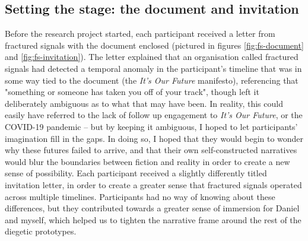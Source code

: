 \subsection{Setting the stage: the document and invitation}
\label{subsec:8-4-1-doc}
Before the research project started, each participant received a letter from fractured signals with the document enclosed  (pictured in figures \ref{fig:fs-document} and \ref{fig:fs-invitation}). The letter explained that an organisation called fractured signals had detected a temporal anomaly in the participant’s timeline that was in some way tied to the document (the \textit{It’s Our Future} manifesto), referencing that "something or someone has taken you off of your track", though left it deliberately ambiguous as to what that may have been. In reality, this could easily have referred to the lack of follow up engagement to \textit{It’s Our Future}, or the COVID-19 pandemic – but by keeping it ambiguous, I hoped to let participants’ imagination fill in the gaps. In doing so, I hoped that they would begin to wonder why these futures failed to arrive, and that their own self-constructed narratives would blur the boundaries between fiction and reality in order to create a new sense of possibility. Each participant received a slightly differently titled invitation letter, in order to create a greater sense that fractured signals operated across multiple timelines. Participants had no way of knowing about these differences, but they contributed towards a greater sense of immersion for Daniel and myself, which helped us to tighten the narrative frame around the rest of the diegetic prototypes.

